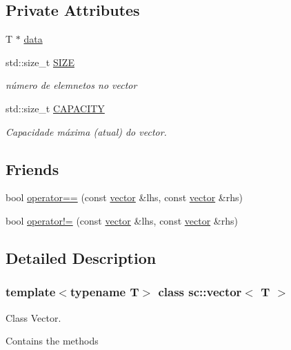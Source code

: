 \subsection*{Private Attributes}
\begin{DoxyCompactItemize}
\item 
T $\ast$ \hyperlink{classsc_1_1vector_ab0607397430a55a5a484dfea79867467}{data}
\item 
std\+::size\+\_\+t \hyperlink{classsc_1_1vector_ad6729b20ad502c5fdf480fec848476f6}{S\+I\+ZE}
\begin{DoxyCompactList}\small\item\em número de elemnetos no vector \end{DoxyCompactList}\item 
std\+::size\+\_\+t \hyperlink{classsc_1_1vector_ae4c67859be8cfdd445d2700d55125184}{C\+A\+P\+A\+C\+I\+TY}
\begin{DoxyCompactList}\small\item\em Capacidade máxima (atual) do vector. \end{DoxyCompactList}\end{DoxyCompactItemize}
\subsection*{Friends}
\begin{DoxyCompactItemize}
\item 
bool \hyperlink{classsc_1_1vector_a33679563540934e4c3e487aa12a63424}{operator==} (const \hyperlink{classsc_1_1vector}{vector} \&lhs, const \hyperlink{classsc_1_1vector}{vector} \&rhs)
\item 
bool \hyperlink{classsc_1_1vector_a2c27118e557a04c2dc8d062e1afe730a}{operator!=} (const \hyperlink{classsc_1_1vector}{vector} \&lhs, const \hyperlink{classsc_1_1vector}{vector} \&rhs)
\end{DoxyCompactItemize}


\subsection{Detailed Description}
\subsubsection*{template$<$typename T$>$\newline
class sc\+::vector$<$ T $>$}

Class Vector. 

Contains the methods 

